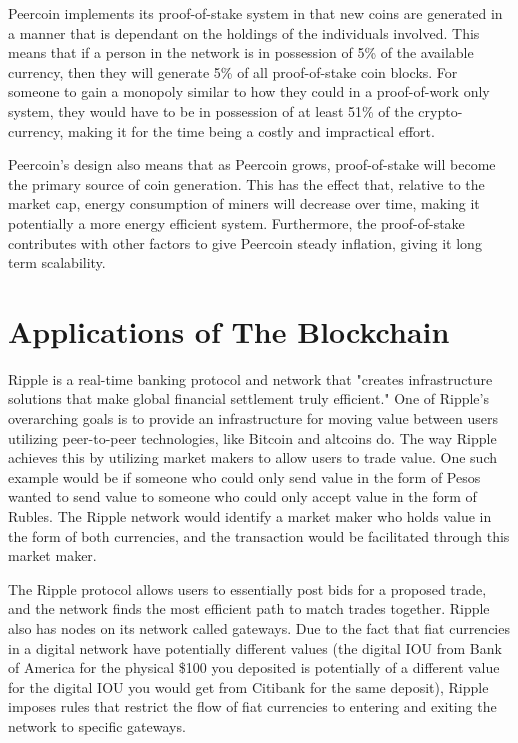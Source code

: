 \documentclass{article}
\begin{document}
	Peercoin implements its proof-of-stake system in that new coins are generated in a manner that is dependant on the holdings of the individuals involved. This means that if a person in the network is in possession of 5\% of the available currency, then they will generate 5\% of all proof-of-stake coin blocks. For someone to gain a monopoly similar to how they could in a proof-of-work only system, they would have to be in possession of at least 51\% of the crypto-currency, making it for the time being a costly and impractical effort.

	Peercoin's design also means that as Peercoin grows, proof-of-stake will become the primary source of coin generation. This has the effect that, relative to the market cap, energy consumption of miners will decrease over time, making it potentially a more energy efficient system. Furthermore, the proof-of-stake contributes with other factors to give Peercoin steady inflation, giving it long term scalability.
	


	
\section{Applications of The Blockchain}

	Ripple is a real-time banking protocol and network that "creates infrastructure solutions that make global financial settlement truly efficient." One of Ripple's overarching goals is to provide an infrastructure for moving value between users utilizing peer-to-peer technologies, like Bitcoin and altcoins do. The way Ripple achieves this by utilizing market makers to allow users to trade value. One such example would be if someone who could only send value in the form of Pesos wanted to send value to someone who could only accept value in the form of Rubles. The Ripple network would identify a market maker who holds value in the form of both currencies, and the transaction would be facilitated through this market maker.
	
	The Ripple protocol allows users to essentially post bids for a proposed trade, and the network finds the most efficient path to match trades together. Ripple also has nodes on its network called gateways. Due to the fact that fiat currencies in a digital network have potentially different values (the digital IOU from Bank of America for the physical \$100 you deposited is potentially of a different value for the digital IOU you would get from Citibank for the same deposit), Ripple imposes rules that restrict the flow of fiat currencies to entering and exiting the network to specific gateways.
	
\end{document}
